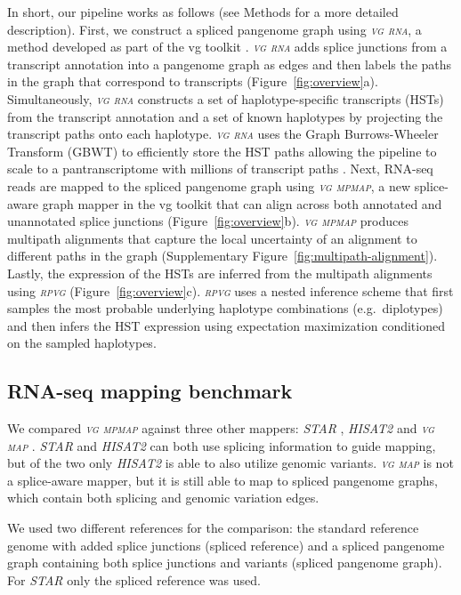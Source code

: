 \documentclass[11pt]{ucthesis}
\newcommand{\tool}[1]{\emph{\textsc{#1}}}
\begin{document}
In short, our pipeline works as follows (see Methods for a more detailed description). First, we construct a spliced pangenome graph using \tool{vg rna}, a method developed as part of the vg toolkit \cite{garrison2018variation}. \tool{vg rna} adds splice junctions from a transcript annotation into a pangenome graph as edges and then labels the paths in the graph that correspond to transcripts (Figure~\ref{fig:overview}a). Simultaneously, \tool{vg rna} constructs a set of haplotype-specific transcripts (HSTs) from the transcript annotation and a set of known haplotypes by projecting the transcript paths onto each haplotype. \tool{vg rna} uses the Graph Burrows-Wheeler Transform (GBWT) to efficiently store the HST paths allowing the pipeline to scale to a pantranscriptome with millions of transcript paths \cite{siren2020haplotype}. Next, RNA-seq reads are mapped to the spliced pangenome graph using \tool{vg mpmap}, a new splice-aware graph mapper in the vg toolkit that can align across both annotated and unannotated splice junctions (Figure~\ref{fig:overview}b). \tool{vg mpmap} produces multipath alignments that capture the local uncertainty of an alignment to different paths in the graph (Supplementary Figure~\ref{fig:multipath-alignment}). Lastly, the expression of the HSTs are inferred from the multipath alignments using \tool{rpvg} (Figure~\ref{fig:overview}c). \tool{rpvg} uses a nested inference scheme that first samples the most probable underlying haplotype combinations (e.g.\ diplotypes) and then infers the HST expression using expectation maximization conditioned on the sampled haplotypes.

\subsection{RNA-seq mapping benchmark}

We compared \tool{vg mpmap} against three other mappers: \tool{STAR} \cite{dobin2013star}, \tool{HISAT2} \cite{kim2019graph} and \tool{vg map} \cite{garrison2018variation}. \tool{STAR} and \tool{HISAT2} can both use splicing information to guide mapping, but of the two only \tool{HISAT2} is able to also utilize genomic variants. \tool{vg map} is not a splice-aware mapper, but it is still able to map to spliced pangenome graphs, which contain both splicing and genomic variation edges. 

We used two different references for the comparison: the standard reference genome with added splice junctions (spliced reference) and a spliced pangenome graph containing both splice junctions and variants (spliced pangenome graph). For \tool{STAR} only the spliced reference was used. 
\end{document}
